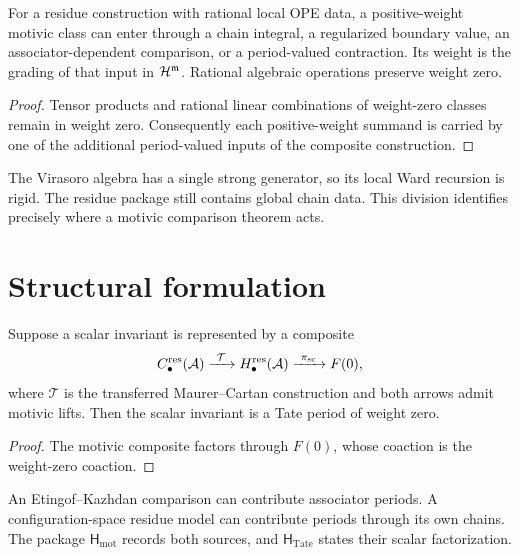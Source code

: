 \begin{proposition}
\label{prop:mzv-would-enter-at-what-weight}
\ClaimStatusProvedHere
For a residue construction with rational local OPE data, a
positive-weight motivic class can enter through a chain integral, a
regularized boundary value, an associator-dependent comparison, or a
period-valued contraction.  Its weight is the grading of that input in
\(\mathcal H^{\mathfrak m}\).  Rational algebraic operations preserve weight
zero.
\end{proposition}

\begin{proof}
Tensor products and rational linear combinations of weight-zero
classes remain in weight zero.  Consequently each positive-weight
summand is carried by one of the additional period-valued inputs of
the composite construction.
\end{proof}

\begin{remark}
\label{rem:vmpar-virasoro-is-generator-rigid}
The Virasoro algebra has a single strong generator, so its local Ward
recursion is rigid.  The residue package still contains global chain
data.  This division identifies precisely where a motivic comparison
theorem acts.
\end{remark}

\section{Structural formulation}
\label{sec:vmpar-structural-reason}

\begin{theorem}
\label{thm:structural-reason-for-purity}
\ClaimStatusConditional
Suppose a scalar invariant is represented by a composite
\[
 C_\bullet^{\mathrm{res}}(\mathcal A)
 \xrightarrow{\ \mathcal T\ }
 H_\bullet^{\mathrm{res}}(\mathcal A)
 \xrightarrow{\ \pi_{\mathrm{sc}}\ }F(0),
\]
where \(\mathcal T\) is the transferred Maurer--Cartan construction
and both arrows admit motivic lifts.  Then the scalar invariant is a
Tate period of weight zero.
\end{theorem}

\begin{proof}
The motivic composite factors through \(F(0)\), whose coaction is the
weight-zero coaction.
\end{proof}

\begin{remark}
\label{rem:vmpar-associator-vs-bar}
An Etingof--Kazhdan comparison can contribute associator periods.  A
configuration-space residue model can contribute periods through its
own chains.  The package \(\mathsf H_{\mathrm{mot}}\) records both
sources, and \(\mathsf H_{\mathrm{Tate}}\) states their scalar
factorization.
\end{remark}

